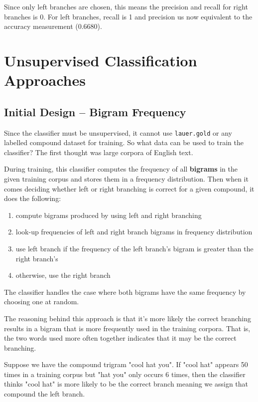 \documentclass{article}
\begin{document}
Since only left branches are chosen, this means the precision and recall for right branches is 0. For left branches, recall is 1 and precision us now equivalent to the accuracy measurement (0.6680).

\section{Unsupervised Classification Approaches}

\subsection{Initial Design -- Bigram Frequency}

Since the classifier must be unsupervised, it cannot use \texttt{lauer.gold} or any labelled compound dataset for training. So what data can be used to train the classifier? The first thought was large corpora of English text.

During training, this classifier computes the frequency of all \textbf{bigrams} in the given training corpus and stores them in a frequency distribution. Then when it comes deciding whether left or right branching is correct for a given compound, it does the following:
\begin{enumerate}
	\item compute bigrams produced by using left and right branching
	\item look-up frequencies of left and right branch bigrams in frequency distribution
	\item use left branch if the frequency of the left branch's bigram is greater than the right branch's
	\item otherwise, use the right branch
\end{enumerate}

The classifier handles the case where both bigrams have the same frequency by choosing one at random.

The reasoning behind this approach is that it's more likely the correct branching results in a bigram that is more frequently used in the training corpora. That is, the two words used more often together indicates that it may be the correct branching.

Suppose we have the compound trigram "cool hat you". If "cool hat" appears 50 times in a training corpus but "hat you" only occurs 6 times, then the classifier thinks "cool hat" is more likely to be the correct branch meaning we assign that compound the left branch.
\end{document}
